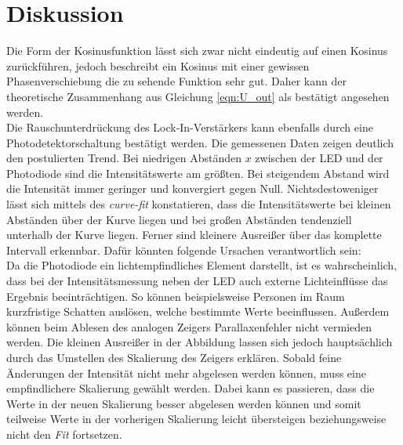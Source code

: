 %

%
\section{Diskussion}
\label{sec:Diskussion}
Die Form der Kosinusfunktion lässt sich zwar nicht eindeutig auf einen Kosinus zurückführen, jedoch beschreibt 
ein Kosinus mit einer gewissen Phasenverschiebung die zu sehende Funktion sehr gut. Daher kann der theoretische 
Zusammenhang aus Gleichung \eqref{eqn:U_out} als bestätigt angesehen werden.\\
\noindent
Die Rauschunterdrückung des Lock-In-Verstärkers kann ebenfalls durch eine Photodetektorschaltung bestätigt werden.
Die gemessenen Daten zeigen deutlich den postulierten Trend. Bei niedrigen Abständen $x$ zwischen der LED und 
der Photodiode sind die Intensitätswerte am größten. Bei steigendem Abstand wird die Intensität immer geringer 
und konvergiert gegen Null.
Nichtsdestoweniger lässt sich mittels des \emph{curve-fit} konstatieren, dass die Intensitätswerte bei kleinen 
Abständen über der Kurve liegen und bei großen Abständen tendenziell unterhalb der Kurve liegen. Ferner sind 
kleinere Ausreißer über das komplette Intervall erkennbar. Dafür könnten folgende Ursachen verantwortlich sein:\\
Da die Photodiode ein lichtempfindliches Element darstellt, ist es wahrscheinlich, dass bei der Intensitätsmessung
neben der LED auch externe Lichteinflüsse das Ergebnis beeinträchtigen. So können beispielsweise Personen im Raum 
kurzfristige Schatten auslösen, welche bestimmte Werte beeinflussen. Außerdem können beim Ablesen des analogen 
Zeigers Parallaxenfehler nicht vermieden werden. Die kleinen Ausreißer in der Abbildung lassen sich jedoch 
hauptsächlich durch das Umstellen des Skalierung des Zeigers erklären. Sobald feine Änderungen der Intensität nicht 
mehr abgelesen werden können, muss eine empfindlichere Skalierung gewählt werden. Dabei kann es passieren, dass die 
Werte in der neuen Skalierung besser abgelesen werden können und somit teilweise Werte in der vorherigen Skalierung
leicht übersteigen beziehungsweise nicht den \emph{Fit} fortsetzen. 
%
